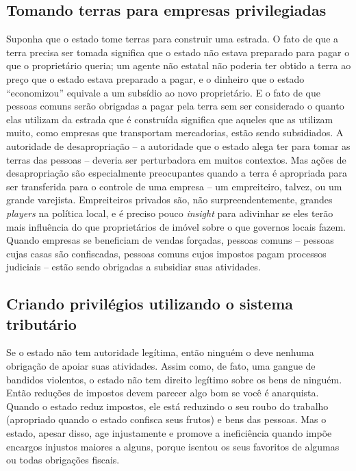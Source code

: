 \subsection*{Tomando terras para empresas privilegiadas}

Suponha que o estado tome terras para construir uma estrada. O fato de que a terra precisa ser tomada significa que o estado não estava preparado para pagar o que o proprietário queria; um agente não estatal não poderia ter obtido a terra ao preço que o estado estava preparado a pagar, e o dinheiro que o estado ``economizou'' equivale a um subsídio ao novo proprietário. E o fato de que pessoas comuns serão obrigadas a pagar pela terra sem ser considerado o quanto elas utilizam da estrada que é construída significa que aqueles que as utilizam muito, como empresas que transportam mercadorias, estão sendo subsidiados. A autoridade de desapropriação -- a autoridade que o estado alega ter para tomar as terras das pessoas -- deveria ser perturbadora em muitos contextos. Mas ações de desapropriação são especialmente preocupantes quando a terra é apropriada para ser transferida para o controle de uma empresa -- um empreiteiro, talvez, ou um grande varejista. Empreiteiros privados são, não surpreendentemente, grandes \emph{players} na política local, e é preciso pouco \emph{insight} para adivinhar se eles terão mais influência do que proprietários de imóvel sobre o que governos locais fazem. Quando empresas se beneficiam de vendas forçadas, pessoas comuns -- pessoas cujas casas são confiscadas, pessoas comuns cujos impostos pagam processos judiciais -- estão sendo obrigadas a subsidiar suas atividades.

\subsection*{Criando privilégios utilizando o sistema tributário}

Se o estado não tem autoridade legítima, então ninguém o deve nenhuma obrigação de apoiar suas atividades. Assim como, de fato, uma gangue de bandidos violentos, o estado não tem direito legítimo sobre os bens de ninguém. Então reduções de impostos devem parecer algo bom se você é anarquista. Quando o estado reduz impostos, ele está reduzindo o seu roubo do trabalho (apropriado quando o estado confisca seus frutos) e bens das pessoas. Mas o estado, apesar disso, age injustamente e promove a ineficiência quando impõe encargos injustos maiores a alguns, porque isentou os seus favoritos de algumas ou todas obrigações fiscais.

